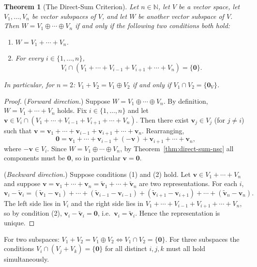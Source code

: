 \documentclass[11pt, a4paper, notitlepage]{report}
\newtheorem{theorem}{Theorem}[section]
\theoremstyle{definition}
\theoremstyle{remark}
\begin{document}
\begin{theorem}[The Direct-Sum Criterion]\label{thm:direct-sum-criterion}
Let $n \in \mathbb{N}$, let $V$ be a vector space, let $V_1, \ldots, V_n$ be vector subspaces of $V$, and let $W$ be another vector subspace of $V$. Then $W = V_1 \oplus \cdots \oplus V_n$ if and only if the following two conditions both hold:
\begin{enumerate}
  \item $W = V_1 + \cdots + V_n$.
  \item For every $i \in \{1, \ldots, n\}$,
  \[
    V_i \cap (V_1 + \cdots + V_{i-1} + V_{i+1} + \cdots + V_n) = \{\mathbf{0}\}.
  \]
\end{enumerate}
In particular, for $n = 2$: $V_1 + V_2 = V_1 \oplus V_2$ if and only if $V_1 \cap V_2 = \{\mathbf{0}_V\}$.
\end{theorem}

\begin{proof}
(\textit{Forward direction.}) Suppose $W = V_1 \oplus \cdots \oplus V_n$. By definition, $W = V_1 + \cdots + V_n$ holds. Fix $i \in \{1,\ldots,n\}$ and let $\mathbf{v} \in V_i \cap (V_1 + \cdots + V_{i-1} + V_{i+1} + \cdots + V_n)$. Then there exist $\mathbf{v}_j \in V_j$ (for $j \neq i$) such that $\mathbf{v} = \mathbf{v}_1 + \cdots + \mathbf{v}_{i-1} + \mathbf{v}_{i+1} + \cdots + \mathbf{v}_n$. Rearranging,
\[
  \mathbf{0} = \mathbf{v}_1 + \cdots + \mathbf{v}_{i-1} + (-\mathbf{v}) + \mathbf{v}_{i+1} + \cdots + \mathbf{v}_n,
\]
where $-\mathbf{v} \in V_i$. Since $W = V_1 \oplus \cdots \oplus V_n$, by Theorem~\ref{thm:direct-sum-nsc} all components must be $\mathbf{0}$, so in particular $\mathbf{v} = \mathbf{0}$.

(\textit{Backward direction.}) Suppose conditions (1) and (2) hold. Let $\mathbf{v} \in V_1 + \cdots + V_n$ and suppose $\mathbf{v} = \mathbf{v}_1 + \cdots + \mathbf{v}_n = \tilde{\mathbf{v}}_1 + \cdots + \tilde{\mathbf{v}}_n$ are two representations. For each $i$,
\[
  \mathbf{v}_i - \tilde{\mathbf{v}}_i = (\tilde{\mathbf{v}}_1 - \mathbf{v}_1) + \cdots + (\tilde{\mathbf{v}}_{i-1} - \mathbf{v}_{i-1}) + (\tilde{\mathbf{v}}_{i+1} - \mathbf{v}_{i+1}) + \cdots + (\tilde{\mathbf{v}}_n - \mathbf{v}_n).
\]
The left side lies in $V_i$ and the right side lies in $V_1 + \cdots + V_{i-1} + V_{i+1} + \cdots + V_n$, so by condition (2), $\mathbf{v}_i - \tilde{\mathbf{v}}_i = \mathbf{0}$, i.e.\ $\mathbf{v}_i = \tilde{\mathbf{v}}_i$. Hence the representation is unique.
\end{proof}

\begin{keyresult}[title={Key Result: The Direct-Sum Criterion}]
For two subspaces: $V_1 + V_2 = V_1 \oplus V_2 \iff V_1 \cap V_2 = \{\mathbf{0}\}$. For three subspaces the conditions $V_i \cap (V_j + V_k) = \{\mathbf{0}\}$ for all distinct $i, j, k$ must all hold simultaneously.
\end{keyresult}
\end{document}
